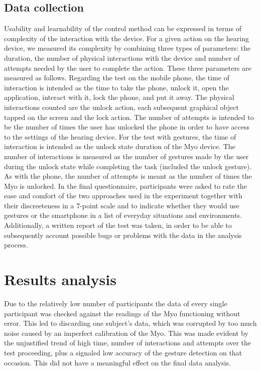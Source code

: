\documentclass[journal]{./IEEEtran}
\begin{document}
\subsection{Data collection}
Usability and learnability of the control method can be expressed in terms of complexity of the interaction with the device. For a given action on the hearing device, we measured its complexity by combining three types of parameters: the duration, the number of physical interactions with the device and number of attempts needed by the user to complete the action. These three parameters are measured as follows.
Regarding the test on the mobile phone, the time of interaction is intended as the time to take the phone, unlock it, open the application, interact with it, lock the phone, and put it away. The physical interactions counted are the unlock action, each subsequent graphical object tapped on the screen and the lock action. The number of attempts is intended to be the number of times the user has unlocked the phone in order to have access to the settings of the hearing device.
For the test with gestures, the time of interaction is intended as the unlock state duration of the Myo device. The number of interactions is measured as the number of gestures made by the user during the unlock state while completing the task (included the unlock gesture). As with the phone, the number of attempts is meant as the number of times the Myo is unlocked.
In the final questionnaire, participants were asked to rate the ease and comfort of the two approaches used in the experiment together with their discreeteness in a 7-point scale and to indicate whether  they would use gestures or the smartphone in a list of everyday situations and environments.
Additionally, a written report of the test was taken, in order to be able to subsequently account possible bugs or problems with the data in the analysis process.

\section{Results analysis}
Due to the relatively low number of participants the data of every single participant was checked against  the readings  of the Myo functioning without error. This led to discarding one subject’s data, which was corrupted by too much noise caused  by an imperfect calibration of the Myo. This was made evident  by the  unjustified trend of high time, number of interactions and attempts over the test proceeding, plus a signaled low accuracy of the gesture detection on that occasion. This did not  have a meaningful effect on the final data analysis.
\end{document}
